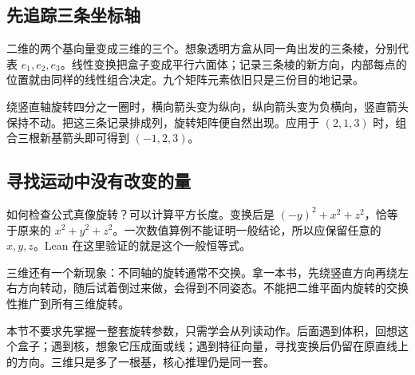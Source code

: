 \subsection*{先追踪三条坐标轴}
二维的两个基向量变成三维的三个。想象透明方盒从同一角出发的三条棱，分别代表 $e_1,e_2,e_3$。线性变换把盒子变成平行六面体；记录三条棱的新方向，内部每点的位置就由同样的线性组合决定。九个矩阵元素依旧只是三份目的地记录。

绕竖直轴旋转四分之一圈时，横向箭头变为纵向，纵向箭头变为负横向，竖直箭头保持不动。把这三条记录排成列，旋转矩阵便自然出现。应用于 $(2,1,3)$ 时，组合三根新基箭头即可得到 $(-1,2,3)$。

\subsection*{寻找运动中没有改变的量}
如何检查公式真像旋转？可以计算平方长度。变换后是 $(-y)^2+x^2+z^2$，恰等于原来的 $x^2+y^2+z^2$。一次数值算例不能证明一般结论，所以应保留任意的 $x,y,z$。Lean 在这里验证的就是这个一般恒等式。

三维还有一个新现象：不同轴的旋转通常不交换。拿一本书，先绕竖直方向再绕左右方向转动，随后试着倒过来做，会得到不同姿态。不能把二维平面内旋转的交换性推广到所有三维旋转。

本节不要求先掌握一整套旋转参数，只需学会从列读动作。后面遇到体积，回想这个盒子；遇到核，想象它压成面或线；遇到特征向量，寻找变换后仍留在原直线上的方向。三维只是多了一根基，核心推理仍是同一套。
